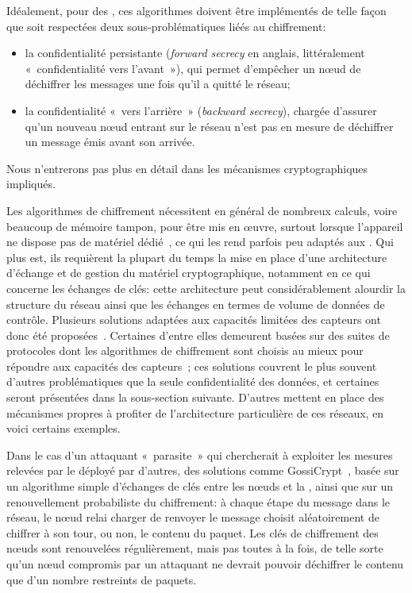 Idéalement, pour des \rcs, ces algorithmes doivent être implémentés de telle façon que soit respectées deux sous-problématiques liéés au chiffrement:
\begin{itemize}
    \item la confidentialité persistante (\textit{forward secrecy} en anglais, littéralement « confidentialité vers l'avant »), qui permet d'empêcher un nœud de déchiffrer les messages une fois qu'il a quitté le réseau;
    \item la confidentialité « vers l'arrière » (\textit{backward secrecy}), chargée d'assurer qu'un nouveau nœud entrant sur le réseau n'est pas en mesure de déchiffrer un message émis avant son arrivée.
\end{itemize}
Nous n'entrerons pas plus en détail dans les mécanismes cryptographiques impliqués.

Les algorithmes de chiffrement nécessitent en général de nombreux calculs, voire beaucoup de mémoire tampon, pour être mis en œuvre, surtout lorsque l'appareil ne dispose pas de matériel dédié~\cite{PLP06}, ce qui les rend parfois peu adaptés aux \rcs.
Qui plus est, ils requièrent la plupart du temps la mise en place d'une architecture d'échange et de gestion du matériel cryptographique, notamment en ce qui concerne les échanges de clés: cette architecture peut considérablement alourdir la structure du réseau ainsi que les échanges en termes de volume de données de contrôle.
Plusieurs solutions adaptées aux capacités limitées des capteurs ont donc été proposées~\cite{OX09}.
Certaines d'entre elles demeurent basées sur des suites de protocoles dont les algorithmes de chiffrement sont choisis au mieux pour répondre aux capacités des capteurs~\cite{SOBMCN11,KR12}; ces solutions couvrent le plus souvent d'autres problématiques que la seule confidentialité des données, et certaines seront présentées dans la sous-section suivante.
D'autres mettent en place des mécanismes propres à profiter de l'architecture particulière de ces réseaux, en voici certains exemples.

Dans le cas d'un attaquant « parasite » qui chercherait à exploiter les mesures relevées par le \rc déployé par d'autres, des solutions comme GossiCrypt~\cite{LPH08}, basée sur un algorithme simple d'échanges de clés entre les nœuds et la \sdb, ainsi que sur un renouvellement probabiliste du chiffrement: à chaque étape du message dans le réseau, le nœud relai charger de renvoyer le message choisit aléatoirement de chiffrer à son tour, ou non, le contenu du paquet.
Les clés de chiffrement des nœuds sont renouvelées régulièrement, mais pas toutes à la fois, de telle sorte qu'un nœud compromis par un attaquant ne devrait pouvoir déchiffrer le contenu que d'un nombre restreints de paquets.

